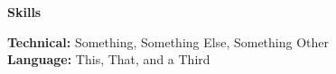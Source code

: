 \vspace{0.25mm}
\begin{center}
    \textbf{Skills}
\end{center}

\textbf{Technical:} Something, Something Else, Something Other\\
\textbf{Language:} This, That, and a Third\\
